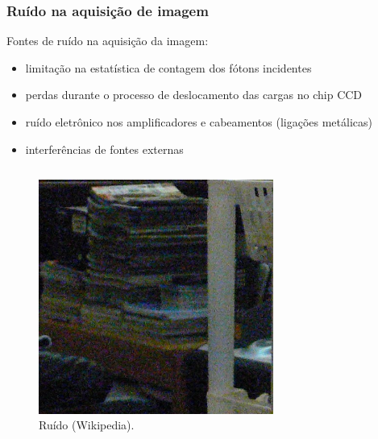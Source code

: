 \begin{frame}[allowframebreaks]
  \frametitle{Ruído na aquisição de imagem}
  Fontes de ruído na aquisição da imagem:
  \begin{itemize}
  \item limitação na estatística de contagem dos fótons incidentes
  \item perdas durante o processo de deslocamento das cargas no chip CCD
  \item ruído eletrônico nos amplificadores e cabeamentos (ligações metálicas)
  \item interferências de fontes externas
  \end{itemize}

  \framebreak

  \begin{columns}[c]
    \begin{figure}[h!]
    \centering
    \includegraphics[width=0.9\textwidth]{images/highimgnoise.jpg}
    \caption{Ruído (Wikipedia).}
    \label{fig:highimgnoise}
    \end{figure}
    \begin{figure}[h!]
    \centering

\end{figure}
\end{columns}
\end{frame}
